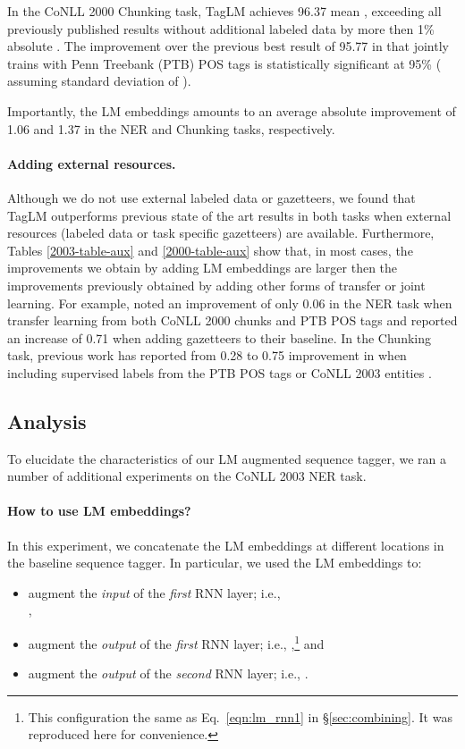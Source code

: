 \documentclass[11pt,a4paper]{article}
\begin{document}
In the CoNLL 2000 Chunking task, TagLM achieves 96.37 mean , exceeding all previously published
results without additional labeled data by more then 1\% absolute . 
The improvement over the previous best result of 95.77 in \citet{joint-many-iclr07} that jointly trains with Penn Treebank (PTB) POS tags is statistically significant at
95\% ( assuming standard deviation of ).

Importantly, the LM embeddings amounts to an average absolute improvement of 1.06 and 1.37  in the NER and Chunking tasks, respectively.

\paragraph{Adding external resources.}
Although we do not use external labeled data or gazetteers, we found that TagLM outperforms previous state of the art results in both tasks when external resources (labeled data or task specific gazetteers) are available.
Furthermore, Tables \ref{2003-table-aux} and \ref{2000-table-aux} show that, in most cases,
the improvements we obtain by adding LM embeddings are larger then the improvements previously
obtained by adding other forms of transfer or joint learning.
For example, \citet{yang-transfer-iclr07} noted an improvement of only 0.06  in the NER task when
transfer learning from both CoNLL 2000 chunks and PTB POS tags and \citet{chiu-nichols-2016} reported
an increase of 0.71  when adding gazetteers to their baseline.
In the Chunking task, previous work has reported from 0.28 to 0.75 improvement in  when including supervised labels from
the PTB POS tags or CoNLL 2003
entities \citep{yang-transfer-iclr07,Sgaard2016DeepML,joint-many-iclr07}.

\subsection{Analysis}
To elucidate the characteristics of our LM augmented sequence tagger, we ran a number of
additional experiments  on the CoNLL 2003 NER task.

\paragraph{How to use LM embeddings?}
In this experiment, we concatenate the LM embeddings at different locations in the baseline sequence tagger.
In particular, we used the LM embeddings  to:
\begin{itemize}
\item augment the \textit{input} of the \textit{first} RNN layer; i.e., \\
,
\item augment
the \textit{output} of the \textit{first} RNN layer; i.e.,
,\footnote{This configuration the same as Eq.~\ref{eqn:lm_rnn1} in \S\ref{sec:combining}. It was reproduced here for convenience.} and
\item augment the \textit{output} of the \textit{second} RNN layer; i.e., .
\end{itemize}
\end{document}
